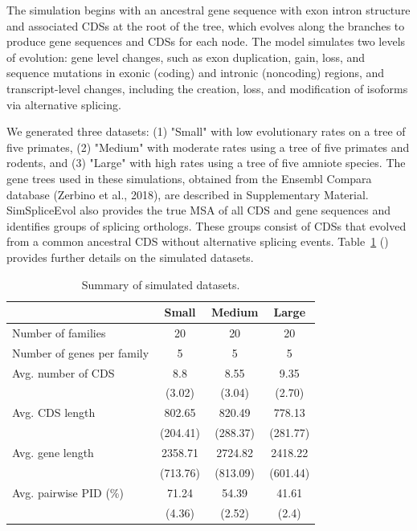 \documentclass[12pt,oneside,letterpaper,english]{article}
\begin{document}
The simulation begins with an ancestral gene sequence with exon intron structure and associated CDSs at the root of the tree, 
which evolves along the branches to produce gene sequences and CDSs for each node. The model simulates two levels of evolution: 
gene level changes, such as exon duplication, gain, loss, and sequence mutations in exonic (coding) and intronic (noncoding) regions, 
and transcript-level changes, including the creation, loss, and modification of isoforms via alternative splicing.

We generated three datasets: (1) "Small" with low evolutionary rates on a tree of five primates, (2) "Medium" with moderate rates using a 
tree of five primates and rodents, and (3) "Large" with high rates using a tree of five amniote species. The gene trees used in these 
simulations, obtained from the Ensembl Compara database (Zerbino et al., 2018), are described in Supplementary Material. SimSpliceEvol 
also provides the true MSA of all CDS and gene sequences and identifies groups of splicing orthologs. These groups consist of CDSs 
that evolved from a common ancestral CDS without alternative splicing events. Table~\ref{tab:simulated_datasets} (\textit{\cite{jammali2022pairwise}}) provides further details on the simulated datasets.

\begin{table}[h!]
    \centering
    \begin{tabular}{lccc}
    \hline
     & \textbf{Small} & \textbf{Medium} & \textbf{Large} \\
    \hline
    Number of families & 20 & 20 & 20 \\
    Number of genes per family & 5 & 5 & 5 \\
    Avg. number of CDS & 8.8 & 8.55 & 9.35 \\
     & (3.02) & (3.04) & (2.70) \\
    Avg. CDS length & 802.65 & 820.49 & 778.13 \\
     & (204.41) & (288.37) & (281.77) \\
    Avg. gene length & 2358.71 & 2724.82 & 2418.22 \\
     & (713.76) & (813.09) & (601.44) \\
    Avg. pairwise PID (\%) & 71.24 & 54.39 & 41.61 \\
     & (4.36) & (2.52) & (2.4) \\
    \hline
    \end{tabular}
    \caption{Summary of simulated datasets.}
    \label{tab:simulated_datasets}
\end{table}
\end{document}
